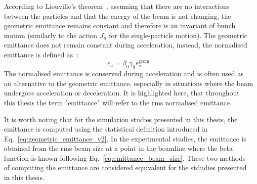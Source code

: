  
 
 According to Liouville’s theorem~\cite{wolski2014}, assuming that there are no interactions between the particles and that the energy of the beam is not changing, the geometric emittance remains constant and therefore is an invariant of bunch motion (similarly to the action $J_u$ for the single-particle motion). The geometric emittance does not remain constant during acceleration, instead, the normalised emittance is defined as~\cite{wolski2014}:
 \begin{equation}\label{eq:normalised_emittance}
     \epsilon_u = \beta_0 \gamma_0 \epsilon^{\mathrm{geom}}_u
 \end{equation}
 The normalised emittance is conserved during acceleration and is often used as an alternative to the geometric emittance, especially in situations where the beam undergoes acceleration or deceleration. It is highlighted here, that throughout this thesis the term "emittance" will refer to the rms normalised emittance.
 
 It is worth noting that for the simulation studies presented in this thesis, the emittance is computed using the statistical definition introduced in Eq.~\eqref{eq:geometric_emittance_v2}. In the experimental studies, the emittance is obtained from the rms beam size at a point in the beamline where the beta function is known following Eq.~\eqref{eq:emittance_beam_size}. These two methods of computing the emittance are considered equivalent for the stdudies presented in this thesis.
 
 
